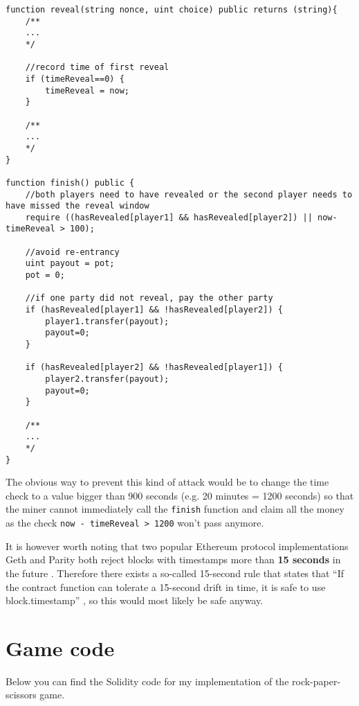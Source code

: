 \documentclass{article}
\begin{document}
    \begin{lstlisting}[language=Solidity]
function reveal(string nonce, uint choice) public returns (string){
    /**
    ...
    */
    
    //record time of first reveal
    if (timeReveal==0) {
        timeReveal = now;
    }

    /**
    ...
    */
}

function finish() public {
    //both players need to have revealed or the second player needs to have missed the reveal window
    require ((hasRevealed[player1] && hasRevealed[player2]) || now-timeReveal > 100);
    
    //avoid re-entrancy
    uint payout = pot;
    pot = 0;
    
    //if one party did not reveal, pay the other party
    if (hasRevealed[player1] && !hasRevealed[player2]) {
        player1.transfer(payout);
        payout=0;
    }
    
    if (hasRevealed[player2] && !hasRevealed[player1]) {
        player2.transfer(payout);
        payout=0;
    }

    /**
    ...
    */
}
    \end{lstlisting}

    \noindent The obvious way to prevent this kind of attack
    would be to change the time check to a value bigger than
    900 seconds (e.g. 20 minutes = 1200 seconds) so that the
    miner cannot immediately call the \verb|finish| function
    and claim all the money as the check \verb|now - timeReveal > 1200| 
    won't pass anymore.
    \newline

    \noindent It is however worth noting that two popular
    Ethereum protocol implementations Geth and Parity both
    reject blocks with timestamps more than {\bfseries 15
    seconds} in the future \cite{ethsecu, geth, parity}.
    Therefore there exists a so-called 15-second rule that
    states that ``If the contract function can tolerate a
    15-second drift in time, it is safe to use
    block.timestamp'' \cite{ethsecu}, so this would most
    likely be safe anyway.

    \section{Game code} \label{s:code}
    Below you can find the Solidity code for my
    implementation of the rock-paper-scissors game.
    
\end{document}
